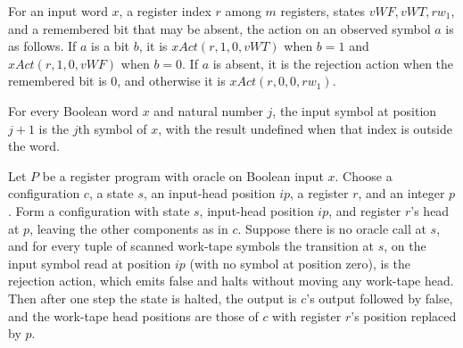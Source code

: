 \begin{definition}
\label{Complexity.LogProg.valWAct}
\leanok
{}
For an input word $x$, a register index $r$ among $m$ registers, states $vWF,vWT,rw_1$,
and a remembered bit that may be absent, the action on an observed symbol $a$ is as
follows. If $a$ is a bit $b$, it is $xAct(r,1,0,vWT)$ when $b=1$ and $xAct(r,1,0,vWF)$
when $b=0$. If $a$ is absent, it is the rejection action when the remembered bit is $0$,
and otherwise it is $xAct(r,0,0,rw_1)$.
\end{definition}

\begin{lemma}
\label{Complexity.LogProg.inSym_succ}
\leanok
{}
For every Boolean word $x$ and natural number $j$, the input symbol at position $j+1$ is
the $j$th symbol of $x$, with the result undefined when that index is outside the word.
\end{lemma}

\begin{lemma}
\label{Complexity.LogProg.rrun_one_rej}
\leanok
{}
Let $P$ be a register program with oracle on Boolean input $x$. Choose a configuration
$c$, a state $s$, an input-head position $ip$, a register $r$, and an integer $p$. Form
a configuration with state $s$, input-head position $ip$, and register $r$'s head at
$p$, leaving the other components as in $c$. Suppose there is no oracle call at $s$, and
for every tuple of scanned work-tape symbols the transition at $s$, on the input symbol
read at position $ip$ (with no symbol at position zero), is the rejection action, which
emits false and halts without moving any work-tape head. Then after one step the state
is halted, the output is $c$'s output followed by false, and the work-tape head
positions are those of $c$ with register $r$'s position replaced by $p$.
\end{lemma}

